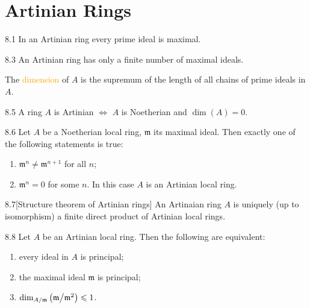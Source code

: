 \chapter{Artinian Rings}

\begin{proposition}{8.1}
	In an Artinian ring every prime ideal is maximal.
\end{proposition}

\begin{proposition}{8.3}
	An Artinian ring has only a finite number of maximal ideals.
\end{proposition}

\begin{definition}
	The \textcolor{orange}{dimension} of $A$ is the supremum of the length of all chains of prime ideals in $A$.
\end{definition}

\begin{proposition}{8.5}
	A ring $A$ is Artinian $\Leftrightarrow$ $A$ is Noetherian and $\operatorname{dim}(A)=0$.
\end{proposition}

\begin{proposition}{8.6}
	Let $A$ be a Noetherian local ring, $\mathfrak{m}$ its maximal ideal. Then exactly one of the following statements is true:
	\begin{enumerate}[label=\textup{(\roman*)}]
		\item $\mathfrak{m}^n\neq\mathfrak{m}^{n+1}$ for all $n$;
		\item $\mathfrak{m}^n=0$ for some $n$. In this case $A$ is an Artinian local ring.
	\end{enumerate}
\end{proposition}

\begin{proposition}{8.7}[Structure theorem of Artinian rings]
	An Artinaian ring $A$ is uniquely (up to isomorphism) a finite direct product of Artinian local rings. 
\end{proposition}

\begin{proposition}{8.8}
	Let $A$ be an Artinian local ring. Then the following are equivalent:
	\begin{enumerate}[label=\textup{(\roman*)}]
		\item every ideal in $A$ is principal;
		\item the maximal ideal $\mathfrak{m}$ is principal;
		\item $\operatorname{dim}_{A/\mathfrak{m}}\left(\mathfrak{m}\middle/\mathfrak{m}^2\right)\leqslant1$.
	\end{enumerate}
\end{proposition}